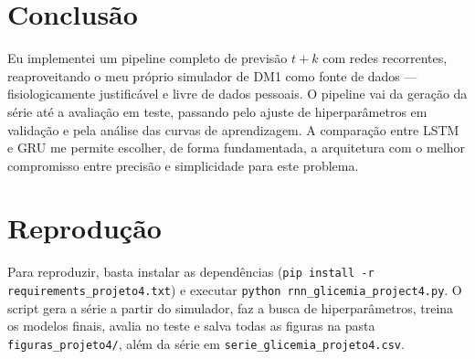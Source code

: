 \documentclass[11pt,a4paper]{article}
\begin{document}
\section{Conclusão}

Eu implementei um pipeline completo de previsão $t+k$ com redes recorrentes,
reaproveitando o meu próprio simulador de DM1 como fonte de dados ---
fisiologicamente justificável e livre de dados pessoais. O pipeline vai da
geração da série até a avaliação em teste, passando pelo ajuste de
hiperparâmetros em validação e pela análise das curvas de aprendizagem. A
comparação entre LSTM e GRU me permite escolher, de forma fundamentada, a
arquitetura com o melhor compromisso entre precisão e simplicidade para este
problema.

\section*{Reprodução}

Para reproduzir, basta instalar as dependências
(\texttt{pip install -r requirements\_projeto4.txt}) e executar
\texttt{python rnn\_glicemia\_project4.py}. O script gera a série a partir do
simulador, faz a busca de hiperparâmetros, treina os modelos finais, avalia no
teste e salva todas as figuras na pasta \texttt{figuras\_projeto4/}, além da
série em \texttt{serie\_glicemia\_projeto4.csv}.
\end{document}

